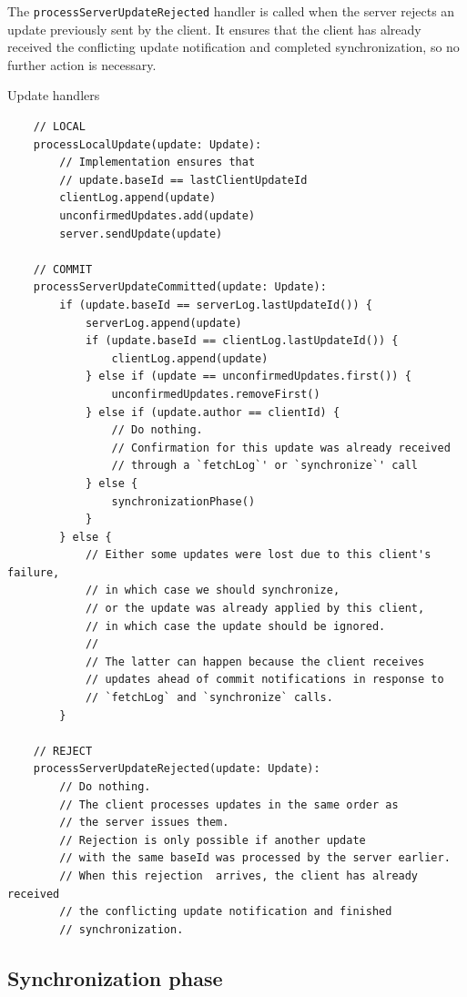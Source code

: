 \documentclass[a4paper, 11pt, oneside]{article}
\theoremstyle{definition}
\begin{document}
The \verb|processServerUpdateRejected| handler is called when the server rejects an update previously sent by the client. It ensures that the client has already received the conflicting update notification and completed synchronization, so no further action is necessary.


\begin{algorithm}
    \caption{Update handlers}\label{alg:update-handlers}
    \begin{verbatim}
    // LOCAL
    processLocalUpdate(update: Update):
        // Implementation ensures that 
        // update.baseId == lastClientUpdateId
        clientLog.append(update)
        unconfirmedUpdates.add(update)
        server.sendUpdate(update)

    // COMMIT
    processServerUpdateCommitted(update: Update):
        if (update.baseId == serverLog.lastUpdateId()) {
            serverLog.append(update)
            if (update.baseId == clientLog.lastUpdateId()) {
                clientLog.append(update)
            } else if (update == unconfirmedUpdates.first()) {
                unconfirmedUpdates.removeFirst()
            } else if (update.author == clientId) {
                // Do nothing.
                // Confirmation for this update was already received 
                // through a `fetchLog`' or `synchronize`' call
            } else {
                synchronizationPhase()
            }
        } else {
            // Either some updates were lost due to this client's failure,
            // in which case we should synchronize,
            // or the update was already applied by this client,
            // in which case the update should be ignored.
            //
            // The latter can happen because the client receives 
            // updates ahead of commit notifications in response to 
            // `fetchLog` and `synchronize` calls.
        }
    
    // REJECT
    processServerUpdateRejected(update: Update):
        // Do nothing.
        // The client processes updates in the same order as
        // the server issues them.
        // Rejection is only possible if another update
        // with the same baseId was processed by the server earlier. 
        // When this rejection  arrives, the client has already received 
        // the conflicting update notification and finished
        // synchronization.
    \end{verbatim}
\end{algorithm}

\subsection{Synchronization phase}
\end{document}
